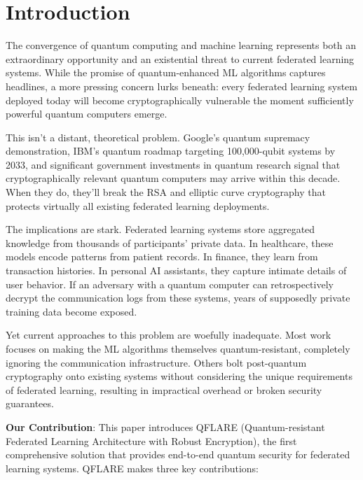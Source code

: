 \documentclass[journal,onecolumn]{IEEEtran}
\begin{document}
\section{Introduction}

The convergence of quantum computing and machine learning represents both an extraordinary opportunity and an existential threat to current federated learning systems. While the promise of quantum-enhanced ML algorithms captures headlines, a more pressing concern lurks beneath: every federated learning system deployed today will become cryptographically vulnerable the moment sufficiently powerful quantum computers emerge.

This isn't a distant, theoretical problem. Google's quantum supremacy demonstration, IBM's quantum roadmap targeting 100,000-qubit systems by 2033, and significant government investments in quantum research signal that cryptographically relevant quantum computers may arrive within this decade. When they do, they'll break the RSA and elliptic curve cryptography that protects virtually all existing federated learning deployments.

The implications are stark. Federated learning systems store aggregated knowledge from thousands of participants' private data. In healthcare, these models encode patterns from patient records. In finance, they learn from transaction histories. In personal AI assistants, they capture intimate details of user behavior. If an adversary with a quantum computer can retrospectively decrypt the communication logs from these systems, years of supposedly private training data become exposed.

Yet current approaches to this problem are woefully inadequate. Most work focuses on making the ML algorithms themselves quantum-resistant, completely ignoring the communication infrastructure. Others bolt post-quantum cryptography onto existing systems without considering the unique requirements of federated learning, resulting in impractical overhead or broken security guarantees.

\textbf{Our Contribution}: This paper introduces QFLARE (Quantum-resistant Federated Learning Architecture with Robust Encryption), the first comprehensive solution that provides end-to-end quantum security for federated learning systems. QFLARE makes three key contributions:
\end{document}
